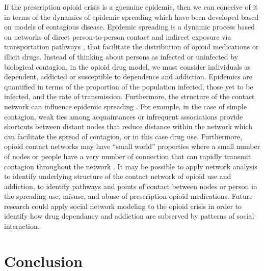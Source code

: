 \documentclass[sigconf]{acmart}
\begin{document}
If the prescription opioid crisis is a guenuine epidemic, then we can conceive 
of it in terms of the dynamics of epidemic spreading which have been developed 
based on models of contagious disease. Epidemic spreading is a dynamic process 
based on networks of direct person-to-person contact and indirect exposure via
transportation pathways \cite{Colizza06}, that facilitate the distribution of 
opioid medications or illicit drugs. Instead of thinking about persons as
infected or uninfected by biological contagion, in the opioid drug model, we 
must consider individuals as dependent, addicted or susceptible to dependence
and addiction. Epidemics are quantified in terms of the proportion of the 
population infected, those yet to be infected, and the rate of transmission. 
Furthermore, the structure of the contact network can influence epidemic 
spreading \cite{pastor01}. For example, in the case of simple contagion, weak 
ties among acquaintances or infrequent associations provide shortcuts between 
distant nodes that reduce distance within the network \cite{granovetter73} 
which can facilitate the spread of contagion, or in this case drug use. 
Furthermore, opioid contact networks may have ``small world'' properties 
where a small number of nodes or people have a very number of connection
that can rapidly transmit contagion throughout the network \cite{watts98}. 
It may be possible to apply network analysis to identify underlying structure 
of the contact network of opioid use and addiction, to identify pathways and 
points of contact between nodes or person in the spreading use, misuse, and
abuse of prescription opioid medications. Future research could apply social 
network modeling to the opioid crisis in order to identify how drug dependancy 
and addiction are subserved by patterns of social interaction. 


\section{Conclusion}
\end{document}
